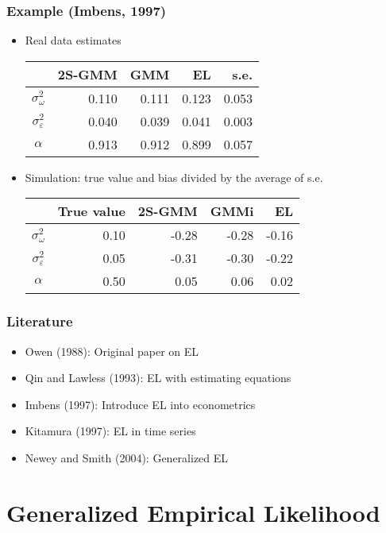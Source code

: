 \documentclass{beamer}
\begin{document}
\begin{frame}
\frametitle{ Example (Imbens, 1997)}
\begin{itemize}
\item Real data estimates \\ \vspace{0.3cm}
\centering
\begin{tabular}{crrrr}\hline
& 2S-GMM & GMM & EL & s.e. \\\hline
\(\sigma_\omega^2\)     & 0.110 & 0.111 & 0.123 & 0.053 \\
\(\sigma_\varepsilon^2\)& 0.040 & 0.039 & 0.041 & 0.003 \\
\(\alpha\)              & 0.913 & 0.912 & 0.899 & 0.057 \\ \hline
\end{tabular}
\pause 
\vspace{0.3cm}

\raggedright
\item Simulation: true value and bias divided by the average of s.e. \\ \vspace{0.3cm}
\centering
\begin{tabular}{crrrr}\hline
 & True value & 2S-GMM & GMMi & EL  \\\hline
\(\sigma_\omega^2\)      & 0.10 & -0.28 & -0.28 & -0.16 \\
\(\sigma_\varepsilon^2\) & 0.05 & -0.31 & -0.30 & -0.22 \\
\(\alpha\)               & 0.50 &  0.05 & 0.06 &   0.02 \\ \hline
\end{tabular}
\end{itemize}
\end{frame}


\begin{frame}
\frametitle{Literature}
\begin{itemize}
\item Owen (1988): Original paper on EL
\item Qin and Lawless (1993): EL with estimating equations
\item Imbens (1997): Introduce EL into econometrics
\item Kitamura (1997): EL in time series
\item Newey and Smith (2004): Generalized EL
\end{itemize}
\end{frame}


\section[GEL]{Generalized Empirical Likelihood}
\frame{\sectionpage}
\end{document}

